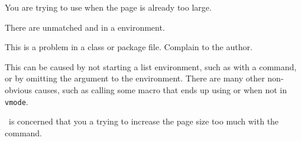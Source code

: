 \begin{plainlist}

\item[] 

    You are trying to use \cmd{\enlargethispage} when the page is already
too large.


\item[]

    There are unmatched \cmd{\pushtabs} and \cmd{\poptabs} in a
 environment.



\item[]

    This is a problem in a class or package file. Complain to the author.


\item[]

   This can be caused by not starting a list environment, such as 
with a \cmd{\item} command, or by omitting the argument to the
 environment. There are many other non-obvious
causes, such as calling some macro that ends up using \cmd{\addvspace} 
or \cmd{\addpenalty} when not in \texttt{vmode}.

\item[]

    \ltx\ is concerned that you a trying to increase the page size
    too much with the \cmd{\enlargthispage} command.




\item[]


\end{plainlist}
